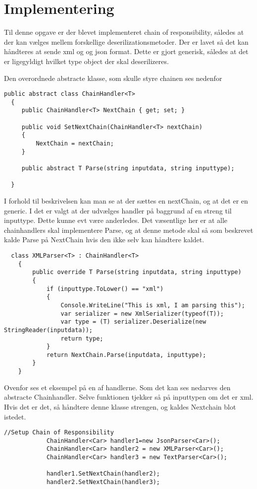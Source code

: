 \chapter{Implementering}

Til denne opgave er der blevet implementeret chain of responsibility, således at der kan vælges mellem forskellige deserilizationsmetoder. Der er lavet så det kan håndteres at sende xml og og json format. Dette er gjort generisk, således at det er ligegyldigt hvilket type object der skal deserilizeres. 

Den overordnede abstracte klasse, som skulle styre chainen ses nedenfor

\begin{lstlisting}
public abstract class ChainHandler<T>
  {
     public ChainHandler<T> NextChain { get; set; }

     public void SetNextChain(ChainHandler<T> nextChain)
     {
         NextChain = nextChain;
     }

     public abstract T Parse(string inputdata, string inputtype);

  }
\end{lstlisting}    

I forhold til beskrivelsen kan man se at der sættes en nextChain, og at det er en generic. I det er valgt at der udvælges handler på baggrund af en streng til inputtype. Dette kunne evt være anderledes. Det væsentlige her er at alle chainhandlers skal implementere Parse, og at denne metode skal så som beskrevet kalde Parse på NextChain hvis den ikke selv kan håndtere kaldet.

\begin{lstlisting}
  class XMLParser<T> : ChainHandler<T>
    {
        public override T Parse(string inputdata, string inputtype)
        {
            if (inputtype.ToLower() == "xml")
            {
                Console.WriteLine("This is xml, I am parsing this");
                var serializer = new XmlSerializer(typeof(T));
                var type = (T) serializer.Deserialize(new StringReader(inputdata));
                return type;
            }
            return NextChain.Parse(inputdata, inputtype);
        }
    }
\end{lstlisting}  

Ovenfor ses et eksempel på en af handlerne. Som det kan ses nedarves den abstracte Chainhandler. Selve funktionen tjekker så på inputtypen om det er xml. Hvis det er det, så håndtere denne klasse strengen, og kaldes Nextchain blot istedet. 

\begin{lstlisting}
//Setup Chain of Responsibility
            ChainHandler<Car> handler1=new JsonParser<Car>();
            ChainHandler<Car> handler2 = new XMLParser<Car>();
            ChainHandler<Car> handler3 = new TextParser<Car>();

            handler1.SetNextChain(handler2);
            handler2.SetNextChain(handler3);
\end{lstlisting}
   
